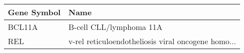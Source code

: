 \begin{tabular}{ll}
\toprule
Gene Symbol &                                               Name \\
\midrule
     BCL11A &                            B-cell CLL/lymphoma 11A \\
        REL & v-rel reticuloendotheliosis viral oncogene homo... \\
\bottomrule
\end{tabular}
